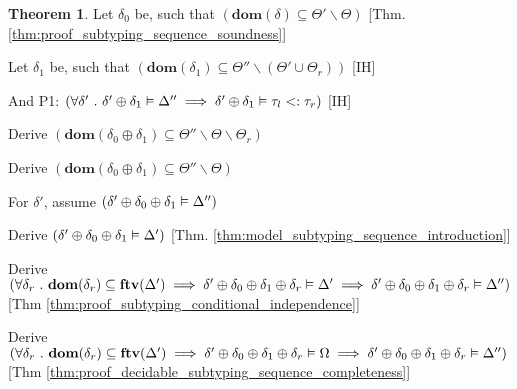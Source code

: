 \documentclass[acmsmall]{acmart}
\theoremstyle{definition}
\newtheorem{theorem}{Theorem}[section]
\begin{document}
\begin{theorem}
  \item \I \N Let $\delta_0$ be, such that $(
    \textbf{dom}(\delta) \subseteq \Theta' \backslash \Theta
  )$ [Thm. \ref{thm:proof_subtyping_sequence_soundness}]

  

  \item \I \N Let $\delta_1$ be, such that $(
    \textbf{dom}(\delta_1) \subseteq \Theta'' \backslash (\Theta' \cup \Theta_r)
  )$ [IH]


  \item \I \N And P1: $(
    \forall \delta' \ .\ 
    \delta' \oplus \delta_1 \vDash \Delta''
    \implies
    \delta' \oplus \delta_1 \vDash \tau_l <: \tau_r
  )$ [IH]

  \item \I \N Derive $(
    \textbf{dom}(\delta_0 \oplus \delta_1) \subseteq \Theta'' \backslash \Theta \backslash \Theta_r
  )$

  \item \I \N Derive $(
    \textbf{dom}(\delta_0 \oplus \delta_1) \subseteq \Theta'' \backslash \Theta
  )$

  \item \I \N For $\delta'$, assume $(
    \delta' \oplus \delta_0 \oplus \delta_1 \vDash \Delta''
  )$ 

  \item \I\I \N Derive $(
    \delta' \oplus \delta_0 \oplus \delta_1 \vDash \Delta'
  )$ [Thm. \ref{thm:model_subtyping_sequence_introduction}]

  \item \I\I \N Derive $(
    \forall \delta_r \ .\ 
    \textbf{dom}(\delta_r) \subseteq \textbf{ftv}(\Delta')
    \implies
    \delta' \oplus \delta_0 \oplus \delta_1 \oplus \delta_r \vDash \Delta' 
    \implies
    \delta' \oplus \delta_0 \oplus \delta_1 \oplus \delta_r \vDash \Delta''
  )$ [Thm \ref{thm:proof_subtyping_conditional_independence}]


  \item \I\I \N Derive $(
    \forall \delta_r \ .\ 
    \textbf{dom}(\delta_r) \subseteq \textbf{ftv}(\Delta')
    \implies
    \delta' \oplus \delta_0 \oplus \delta_1 \oplus \delta_r \vDash \Omega 
    \implies
    \delta' \oplus \delta_0 \oplus \delta_1 \oplus \delta_r \vDash \Delta''
  )$ [Thm \ref{thm:proof_decidable_subtyping_sequence_completeness}]


\end{theorem}
\end{document}
